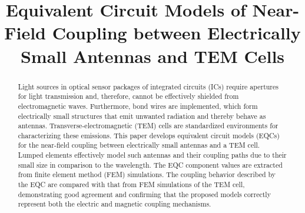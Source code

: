\documentclass[conference]{IEEEtran}
\begin{document}
\title{Equivalent Circuit Models of Near-Field Coupling between Electrically Small Antennas and TEM Cells}

\author{%
\and
{}
\and
{}
}

\maketitle

\begin{abstract}
Light sources in optical sensor packages of integrated circuits (ICs) require apertures for light transmission and, therefore, cannot be effectively shielded from electromagnetic waves. Furthermore, bond wires are implemented, which form electrically small structures that emit unwanted radiation and thereby behave as antennas. Transverse-electromagnetic (TEM) cells are standardized environments for characterizing these emissions. 
This paper develops equivalent circuit models (EQCs) for the near-field coupling between electrically small antennas and a TEM cell. Lumped elements effectively model such antennas and their coupling paths due to their small size in comparison to the wavelength. The EQC component values are extracted from finite element method (FEM) simulations. The coupling behavior described by the EQC are compared with that from FEM simulations of the TEM cell, demonstrating good agreement and confirming that the proposed models correctly represent both the electric and magnetic coupling mechanisms.
\end{abstract}
\end{document}
